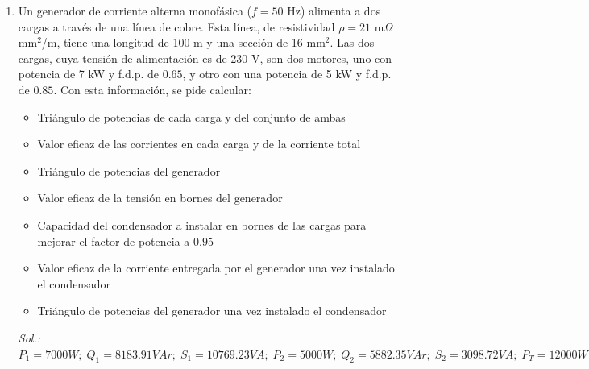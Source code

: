 \begin{enumerate}
\item Un generador de corriente alterna monofásica ($f=50$ Hz)
  alimenta a dos cargas a través de una línea de cobre. Esta línea, de
  resistividad $\rho=21$ m$\Omega$ mm$^2$/m, tiene una longitud de 100
  m y una sección de 16 mm$^2$. Las dos cargas, cuya tensión de
  alimentación es de 230 V, son dos motores, uno con potencia de 7 kW
  y f.d.p. de $0.65$, y otro con una potencia de 5 kW y f.d.p. de
  $0.85$. Con esta información, se pide calcular:
  \begin{itemize}
  \item Triángulo de potencias de cada carga y del conjunto de ambas
  \item Valor eficaz de las corrientes en cada carga y de la corriente
    total
  \item Triángulo de potencias del generador
  \item Valor eficaz de la tensión en bornes del generador
  \item Capacidad del condensador a instalar en bornes de las cargas
    para mejorar el factor de potencia a $0.95$
  \item Valor eficaz de la corriente entregada por el generador una
    vez instalado el condensador
  \item Triángulo de potencias del generador una vez instalado el
    condensador
  \end{itemize}
  \emph{Sol.:
    $P_1=7000W;\;
    Q_1=8183.91VAr;\;S_1=10769.23VA;\;P_2=5000W;\;Q_2=5882.35VAr;\;S_2=3098.72VA;\;P_T=12000W;\;Q_T=11282.63VAr;\;S_T=16471.12VA;\,
    I_1=46.82\,A;\;I_2=25.58\,A;\;I_T=71.62\,A;\,P_g=13333.65
    W;\;Q_g=11282.63 VAr;\,S_g=17466.65 VA;\;U_g=243.88 V;\; C=441.66
    \mu F;\,I'=54.92 A;\;P_g'=12784.21 W;\;Q_g'=3944.21
    VAr;\;S_g'=13378.82 VA$}


\end{enumerate}

